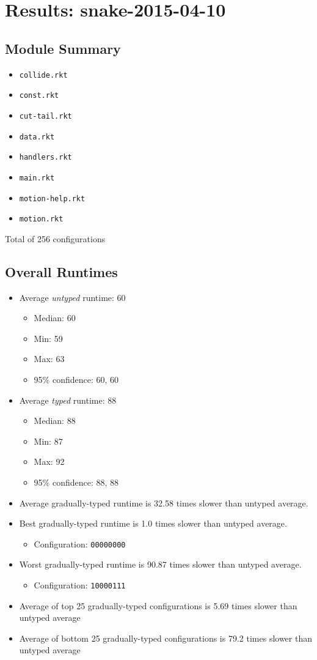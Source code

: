 \documentclass{article}
\newcommand{\mono}[1]{\texttt{#1}}
\begin{document}
\section{Results: snake-2015-04-10}

\subsection{Module Summary}
\begin{itemize}
\item \mono{collide.rkt}
\item \mono{const.rkt}
\item \mono{cut-tail.rkt}
\item \mono{data.rkt}
\item \mono{handlers.rkt}
\item \mono{main.rkt}
\item \mono{motion-help.rkt}
\item \mono{motion.rkt}\end{itemize}
Total of 256 configurations

\subsection{Overall Runtimes}
\begin{itemize}
\item Average \emph{untyped} runtime: 60
  \begin{itemize}
  \item Median: 60
  \item Min: 59
  \item Max: 63
  \item 95\% confidence: 60, 60
  \end{itemize}
\item Average \emph{typed} runtime: 88
  \begin{itemize}
  \item Median: 88
  \item Min: 87
  \item Max: 92
  \item 95\% confidence: 88, 88
  \end{itemize}
\item Average gradually-typed runtime is 32.58 times slower than untyped average.
\item Best gradually-typed runtime is 1.0 times slower than untyped average.
\begin{itemize}\item Configuration: \mono{00000000}\end{itemize}
\item Worst gradually-typed runtime is 90.87 times slower than untyped average.
\begin{itemize}\item Configuration: \mono{10000111}\end{itemize}
\item Average of top 25 gradually-typed configurations is 5.69 times slower than untyped average
\item Average of bottom 25 gradually-typed configurations is 79.2 times slower than untyped average
\end{itemize}
\end{document}
